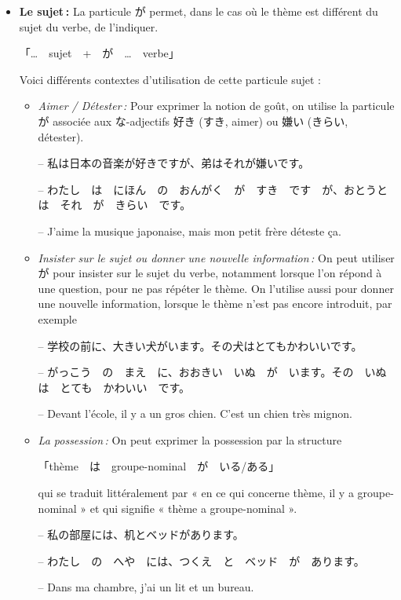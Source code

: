     \begin{itemize}
        \item \textbf{Le sujet :} La particule が permet, dans le cas où le thème est différent du sujet du verbe, de l'indiquer.
        \begin{center}
            「\dots　sujet　+　が　\dots　verbe」
        \end{center}
        Voici différents contextes d'utilisation de cette particule sujet :
        \begin{itemize}
            \item \textit{Aimer / Détester :} Pour exprimer la notion de goût, on utilise la particule が associée aux な-adjectifs 好き (すき, aimer) ou 嫌い (きらい, détester). 
            \begin{tcolorbox}
                -- 私は日本の音楽が好きですが、弟はそれが嫌いです。

                -- わたし　は　にほん　の　おんがく　が　すき　です　が、おとうと　は　それ　が　きらい　です。

                -- J'aime la musique japonaise, mais mon petit frère déteste ça.
            \end{tcolorbox}
            \item \textit{Insister sur le sujet ou donner une nouvelle information :} On peut utiliser が pour insister sur le sujet du verbe, notamment lorsque l'on répond à une question, pour ne pas répéter le thème. On l'utilise aussi pour donner une nouvelle information, lorsque le thème n'est pas encore introduit, par exemple
            \begin{tcolorbox}
                -- 学校の前に、大きい犬がいます。その犬はとてもかわいいです。

                -- がっこう　の　まえ　に、おおきい　いぬ　が　います。その　いぬ　は　とても　かわいい　です。

                -- Devant l'école, il y a un gros chien. C'est un chien très mignon.
            \end{tcolorbox}
            \item \textit{La possession :} On peut exprimer la possession par la structure 
            \begin{center}
                「thème　は　groupe-nominal　が　いる/ある」
            \end{center}
            qui se traduit littéralement par « en ce qui concerne thème, il y a groupe-nominal » et qui signifie « thème a groupe-nominal ».
            \begin{tcolorbox}
                -- 私の部屋には、机とベッドがあります。

                -- わたし　の　へや　には、つくえ　と　ベッド　が　あります。

                -- Dans ma chambre, j'ai un lit et un bureau.
            \end{tcolorbox}
        \end{itemize}
    \end{itemize}

